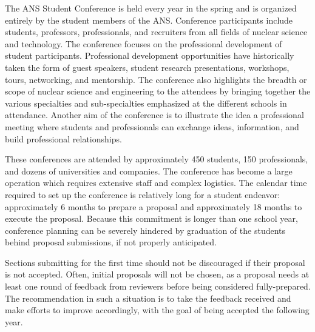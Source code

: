 \documentclass[12pt]{article}
\begin{document}
The ANS Student Conference is held every year in the spring and is organized entirely by the student members of the ANS. 
Conference participants include students, professors, professionals, and recruiters from all fields of nuclear science and technology. 
The conference focuses on the professional development of student participants. 
Professional development opportunities have historically taken the form of guest speakers, student research presentations, workshops, tours, networking, and mentorship. 
The conference also highlights the breadth or scope of nuclear science and engineering to the attendees by bringing together the various specialties and sub-specialties emphasized at the different schools in attendance.
Another aim of the conference is to illustrate the idea a professional meeting where students and professionals can exchange ideas, information, and build professional relationships.

These conferences are attended by approximately 450 students, 150 professionals, and
dozens of universities and companies. The conference has become a large operation
which requires extensive staff and complex logistics. The calendar time required to set
up the conference is relatively long for a student endeavor: approximately 6 months to
prepare a proposal and approximately 18 months to execute the proposal.
Because this commitment is longer than one school year, conference planning can be
severely hindered by graduation of the students behind proposal submissions, if not properly anticipated.

Sections submitting for the first time should not be discouraged if their proposal is not accepted. Often, initial proposals will not be chosen, as a proposal needs at least one round of feedback from reviewers before being considered fully-prepared.
The recommendation in such a situation is to take the feedback received and make efforts to improve accordingly, with the goal of being accepted the following year.
\end{document}
